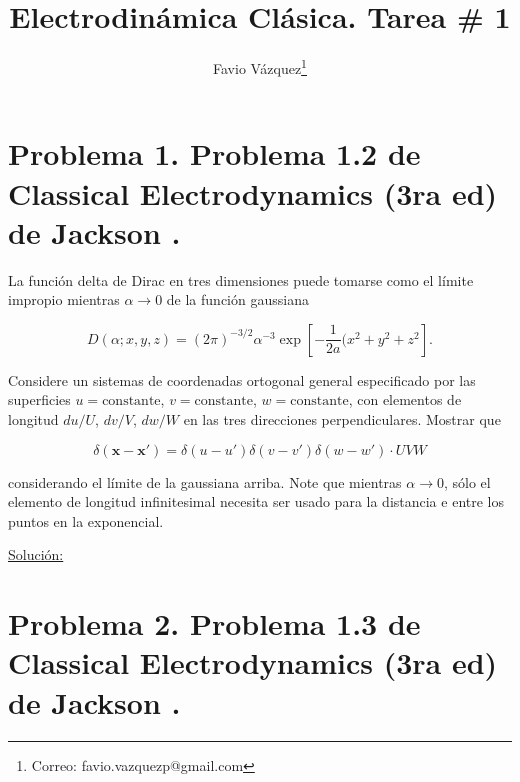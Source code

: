 \documentclass[a4paper,10pt]{article}
\title{Electrodinámica Clásica. Tarea \# 1}
\author{Favio Vázquez\thanks{Correo: favio.vazquezp@gmail.com}}\affil{Instituto de Ciencias Nucleares. Universidad Nacional Autónoma de México.}
\date{}
\numberwithin{equation}{section}
\begin{document}
\makeatletter
\def\@maketitle{%
  \newpage
  \null
  \vskip 2em%
  \begin{center}%
  \let \footnote \thanks
    {\Large\bfseries \@title \par}%
    \vskip 1.5em%
    {\normalsize
      \lineskip .5em%
      \begin{tabular}[t]{c}%
        \@author
      \end{tabular}\par}%
    \vskip 1em%
    {\normalsize \@date}%
  \end{center}%
  \par
  \vskip 1.5em}
\makeatother

\maketitle

\section{Problema 1. Problema 1.2 de Classical Electrodynamics (3ra ed) de 
Jackson \cite{jackson}.}

La función delta de Dirac en tres dimensiones puede tomarse como el límite impropio 
mientras $\alpha \rightarrow 0$ de la función gaussiana 

$$
D(\alpha;x,y,z) = (2\pi)^{-3/2}\alpha^{-3}\exp\left[-\frac{1}{2a}(x^2 + y^2 + z^2 \right].
$$

Considere un sistemas de coordenadas ortogonal general especificado por las superficies 
$u = \text{constante}$, $v = \text{constante}$, $w = \text{constante}$, con elementos 
de longitud $du/U$, $dv/V$, $dw/W$ en las tres direcciones perpendiculares. Mostrar 
que

$$
\delta(\mathbf{x} - \mathbf{x}') = \delta(u - u')\delta(v - v')\delta(w - w')\cdot UVW
$$

considerando el límite de la gaussiana arriba. Note que mientras $\alpha \rightarrow 
0$, sólo el elemento de longitud infinitesimal necesita ser usado para la distancia e
entre los puntos en la exponencial.

\vspace{.3cm}

\underline{Solución:} \vspace{.3cm}

\section{Problema 2. Problema 1.3 de Classical Electrodynamics (3ra ed) de 
Jackson \cite{jackson}.}
\end{document}
